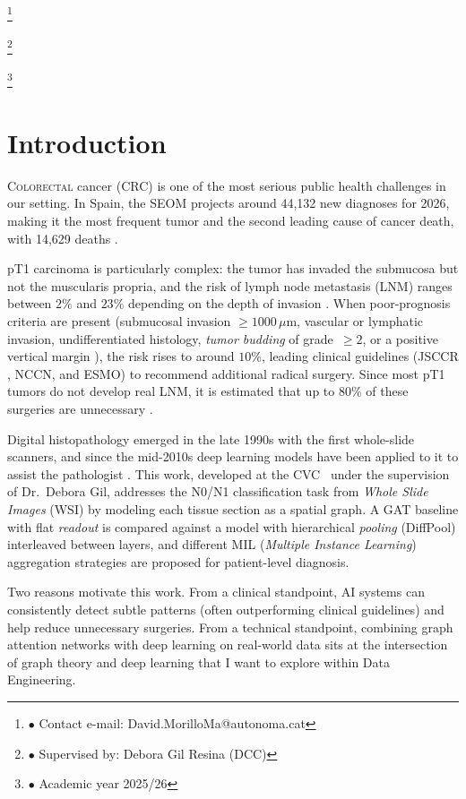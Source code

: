 \documentclass[10pt,a4paper,twocolumn,twoside]{article}
\newcommand\blfootnote[1]{%
  \begingroup
  \renewcommand\thefootnote{}\footnote{#1}%
  \addtocounter{footnote}{-1}%
  \endgroup
}
\begin{document}
\blfootnote{$\bullet$ Contact e-mail: David.MorilloMa@autonoma.cat}
\blfootnote{$\bullet$ Supervised by: Debora Gil Resina (DCC)} \blfootnote{$\bullet$ Academic year 2025/26}

\section{Introduction}

\lettrine[lines=3]{C}{olorectal} cancer (CRC) is one of the most serious public health challenges in our
setting. In Spain, the SEOM projects around 44,132 new diagnoses for 2026, making it the
most frequent tumor and the second leading cause of cancer death, with 14,629 deaths \cite{seom2026}.

pT1 carcinoma is particularly complex: the tumor has invaded the submucosa but not the muscularis propria, and the risk of
lymph node metastasis (LNM) ranges between
$2\%$ and $23\%$ depending on the depth
of invasion \cite{ParcSalutMar2013}.
When poor-prognosis criteria are present (submucosal invasion $\geq\!1000\,\mu$m,
vascular or lymphatic invasion, undifferentiated histology, \textit{tumor budding} of
grade~$\geq\!2$, or a positive vertical margin \cite{jsccr2019,dawson2024budding}), the risk rises
to around $10\%$, leading clinical guidelines (JSCCR \cite{jsccr2019}, NCCN, and
ESMO) to recommend additional radical surgery. Since most pT1
tumors do not develop real LNM, it is estimated that up to $80\%$ of these surgeries are
unnecessary \cite{zaffalon2023,MartinezDeJuan2024}.

Digital histopathology emerged in the late 1990s with the first whole-slide
scanners, and since the mid-2010s deep learning models have been applied to it to assist the pathologist \cite{bejnordi2017camelyon}. This work,
developed at the CVC~\cite{cvc} under the supervision of Dr.\ Debora Gil, addresses the
N0/N1 classification task from \textit{Whole Slide Images} (WSI) by modeling each tissue
section as a spatial graph. A GAT baseline with flat
\textit{readout} is compared against a model with hierarchical \textit{pooling} (DiffPool) interleaved between layers, and
different MIL (\textit{Multiple Instance Learning}) aggregation strategies are proposed
for patient-level diagnosis.

Two reasons motivate this work. From a clinical standpoint, AI systems can
consistently detect subtle patterns (often outperforming clinical guidelines) and help reduce unnecessary
surgeries. From a technical standpoint, combining graph attention networks with
deep learning on real-world data sits at the intersection of graph theory and deep learning
that I want to explore within Data Engineering.
\end{document}
